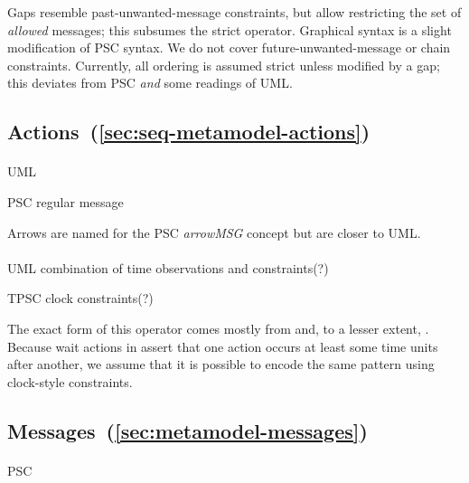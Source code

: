 Gaps resemble past-unwanted-message constraints, but
allow restricting the set of \emph{allowed} messages;
this subsumes the strict operator.  Graphical syntax is a slight
modification of PSC syntax.  We do not cover
future-unwanted-message or chain constraints.  Currently, all
ordering is assumed strict unless modified by a gap; this
deviates from PSC \emph{and} some readings of UML.
    
\subsection{Actions~(\ref{sec:seq-metamodel-actions})}

\paragraph{\marrowaction}
\begin{featset}
\item[UML] 
\item[PSC] regular message
\end{featset}

Arrows are named for the PSC \emph{arrowMSG} concept but are closer
to UML.
      
\paragraph{\mwaitaction}
\begin{featset}
\item[UML] combination of time observations and constraints(?)
\item[TPSC] clock constraints(?)
\end{featset}

The exact form of this operator comes mostly from \robochart{} and, to
a lesser extent, \tockcsp.
Because wait actions in \langname{} assert that one
action occurs at least some time units after another, we assume that it is
possible to encode the same pattern using clock-style constraints.

\subsection{Messages~(\ref{sec:metamodel-messages})}

\paragraph{\mmessageset}
\begin{featset}
\item[PSC] 
\end{featset}


